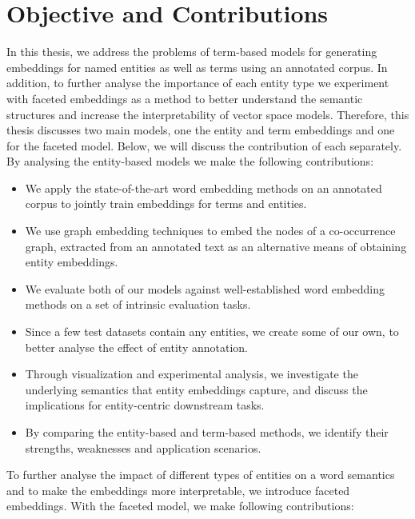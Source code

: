 \section{Objective and Contributions}
In this thesis, we address the problems of term-based models for generating embeddings for named entities as well as terms using an annotated corpus. In addition, to further analyse the importance of each entity type we experiment with faceted embeddings as a method to better understand the semantic structures and increase the interpretability of vector space models. Therefore, this thesis discusses two main models, one the entity and term embeddings and one for the faceted model. Below, we will discuss the contribution of each separately.\\
By analysing the entity-based models we make the following contributions:
\begin{itemize}
\item We apply the state-of-the-art word embedding methods on an annotated corpus to jointly train embeddings for terms and entities. 
\item We use graph embedding techniques to embed the nodes of a co-occurrence graph, extracted from an annotated text as an alternative means of obtaining entity embeddings. 
\item We evaluate both of our models against well-established word embedding methods on a set of intrinsic evaluation tasks. 
\item Since a few test datasets contain any entities, we create some of our own, to better analyse the effect of entity annotation. 
\item Through visualization and experimental analysis, we investigate the underlying semantics that entity embeddings capture,  and discuss the implications for entity-centric downstream tasks.
\item By comparing the entity-based and term-based methods, we identify their strengths, weaknesses and application scenarios.
\end{itemize}
To further analyse the impact of different types of entities on a word semantics and to make the embeddings more interpretable, we introduce faceted embeddings. With the faceted model, we make following contributions: 
